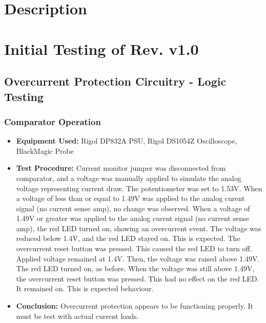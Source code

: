   \section{Description}
  
  \section{Initial Testing of Rev. v1.0}
  
  \subsection{Overcurrent Protection Circuitry - Logic Testing}
  
  \subsubsection{Comparator Operation}

  \begin{itemize}
          \item \textbf{Equipment Used:} Rigol DP832A PSU, Rigol DS1054Z Oscilloscope, BlackMagic Probe
          \item \textbf{Test Procedure:} Current monitor jumper was disconnected from comparator, and a voltage was manually applied to simulate the analog voltage representing current draw.
          The potentiometer was set to 1.53V. 
          When a voltage of less than or equal to 1.49V was applied to the analog curent signal (no current sense amp), no change was observed.
          When a voltage of 1.49V or greater was applied to the analog curent signal (no current sense amp), the red LED turned on, showing an overcurrent event.
          The voltage was reduced below 1.4V, and the red LED stayed on.
          This is expected. 
          The overcurrent reset button was pressed. 
          This caused the red LED to turn off. 
          Applied voltage remained at 1.4V. 
          Then, the voltage was raised above 1.49V.
          The red LED turned on, as before.
          When the voltage was still above 1.49V, the overcurrent reset button was pressed.
          This had no effect on the red LED. 
          It remained on. 
          This is expected behaviour.
          \item \textbf{Conclusion:} Overcurrent protection appears to be functioning properly.
          It must be test with actual current loads.
  \end{itemize}

